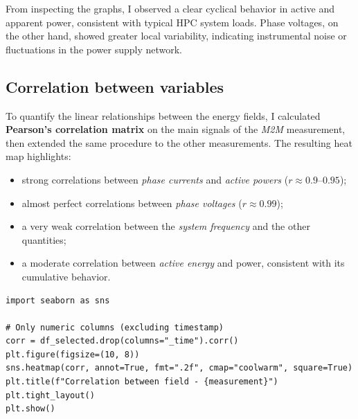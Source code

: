 From inspecting the graphs, I observed a clear cyclical behavior in active and apparent power, consistent with typical HPC system loads. Phase voltages, on the other hand, showed greater local variability, indicating instrumental noise or fluctuations in the power supply network.

\subsection{Correlation between variables}

To quantify the linear relationships between the energy fields, I calculated \textbf{Pearson's correlation matrix} on the main signals of the \emph{M2M} measurement, then extended the same procedure to the other measurements.  
The resulting heat map highlights:
\begin{itemize}
  \item strong correlations between \emph{phase currents} and \emph{active powers} ($r \approx 0.9$–$0.95$);
  \item almost perfect correlations between \emph{phase voltages} ($r \approx 0.99$);
  \item a very weak correlation between the \emph{system frequency} and the other quantities;
  \item a moderate correlation between \emph{active energy} and power, consistent with its cumulative behavior.
\end{itemize}

\begin{listing}[H]
\begin{verbatim}
import seaborn as sns

# Only numeric columns (excluding timestamp)
corr = df_selected.drop(columns="_time").corr()
plt.figure(figsize=(10, 8))
sns.heatmap(corr, annot=True, fmt=".2f", cmap="coolwarm", square=True)
plt.title(f"Correlation between field - {measurement}")
plt.tight_layout()
plt.show()
\end{verbatim}
\end{listing}

